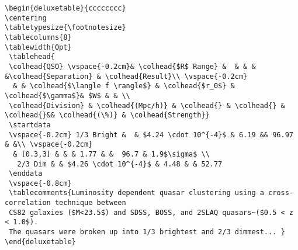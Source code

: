 \begin{lstlisting}
\begin{deluxetable}{cccccccc}
\centering
\tabletypesize{\footnotesize}
\tablecolumns{8} 
\tablewidth{0pt}
 \tablehead{
 \colhead{QSO} \vspace{-0.2cm}& \colhead{$R$ Range} &  & & &  &\colhead{Separation} & \colhead{Result}\\ \vspace{-0.2cm}
  & & \colhead{$\langle f \rangle$} & \colhead{$r_0$} &  \colhead{$\gamma$}& $W$ & & \\
 \colhead{Division} & \colhead{(Mpc/h)} & \colhead{} & \colhead{} & \colhead{}&& \colhead{(\%)} & \colhead{Strength}}
 \startdata 
 \vspace{-0.2cm} 1/3 Bright &  & $4.24 \cdot 10^{-4}$ & 6.19 && 96.97 & &\\ \vspace{-0.2cm}
  & [0.3,3] & & & 1.77 & &  96.7 & 1.9$\sigma$ \\ 
   2/3 Dim & & $4.26 \cdot 10^{-4}$ & 4.48 & & 52.77
 \enddata
 \vspace{-0.8cm}
 \tablecomments{Luminosity dependent quasar clustering using a cross-correlation technique between 
 CS82 galaxies ($M<23.5$) and SDSS, BOSS, and 2SLAQ quasars~($0.5 < z < 1.0$). 
 The quasars were broken up into 1/3 brightest and 2/3 dimmest... }
\end{deluxetable}
\end{lstlisting}
